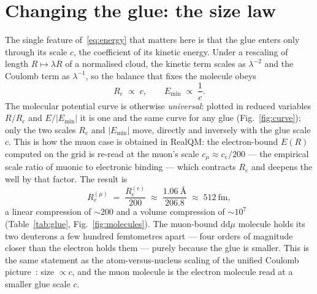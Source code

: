 \documentclass[11pt]{article}
\begin{document}
\section{Changing the glue: the size law}

The single feature of~\eqref{eq:energy} that matters here is that the glue enters only through its scale
$c$, the coefficient of its kinetic energy. Under a rescaling of length $R\mapsto\lambda R$ of a
normalised cloud, the kinetic term scales as $\lambda^{-2}$ and the Coulomb term as $\lambda^{-1}$, so
the balance that fixes the molecule obeys
\begin{equation}
R_e \;\propto\; c, \qquad E_{\min}\;\propto\;\frac1c .
\label{eq:scaling}
\end{equation}
The molecular potential curve is otherwise \emph{universal}: plotted in reduced variables $R/R_e$ and
$E/|E_{\min}|$ it is one and the same curve for any glue (Fig.~\ref{fig:curve}); only the two scales
$R_e$ and $|E_{\min}|$ move, directly and inversely with the glue scale $c$. This is how the muon case
is obtained in RealQM: the electron-bound $E(R)$ computed on the grid is re-read at the muon's scale
$c_\mu\approx c_e/200$ --- the empirical scale ratio of muonic to electronic binding --- which contracts
$R_e$ and deepens the well by that factor. The result is
\begin{equation}
R_e^{(\mu)} \;=\; \frac{R_e^{(e)}}{200} \;\approx\; \frac{1.06~\text{\AA}}{206.8}
\;\approx\; 512~\text{fm},
\end{equation}
a linear compression of $\sim\!200$ and a volume compression of $\sim\!10^{7}$
(Table~\ref{tab:glue}, Fig.~\ref{fig:molecules}). The muon-bound $\mathrm{dd}\mu$ molecule holds its two
deuterons a few hundred femtometres apart --- four orders of magnitude closer than the electron holds
them --- purely because the glue is smaller. This is the same statement as the atom-versus-nucleus
scaling of the unified Coulomb picture~\cite{Johnson-Unified}: size $\propto c$, and the muon molecule is
the electron molecule read at a smaller glue scale $c$.
\end{document}
